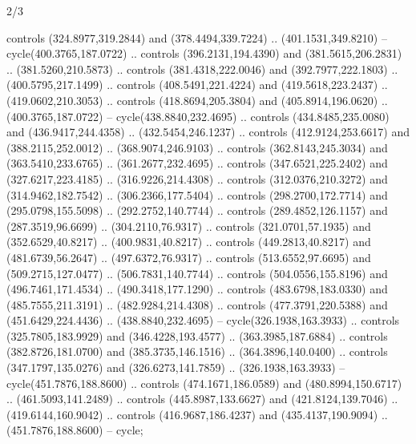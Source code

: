 \begin{flagdescription}{2/3}
\begin{scope}[xshift=0.5\flaglength,yshift=0.5\flagwidth,scale=\flagwidth/444.17]
\begin{scope}[y=-0.8pt, x=0.8pt,shift={(-400,-250)}]
  controls (324.8977,319.2844) and (378.4494,339.7224) .. (401.1531,349.8210) --
  cycle(400.3765,187.0722) .. controls (396.2131,194.4390) and
  (381.5615,206.2831) .. (381.5260,210.5873) .. controls (381.4318,222.0046) and
  (392.7977,222.1803) .. (400.5795,217.1499) .. controls (408.5491,221.4224) and
  (419.5618,223.2437) .. (419.0602,210.3053) .. controls (418.8694,205.3804) and
  (405.8914,196.0620) .. (400.3765,187.0722) -- cycle(438.8840,232.4695) ..
  controls (434.8485,235.0080) and (436.9417,244.4358) .. (432.5454,246.1237) ..
  controls (412.9124,253.6617) and (388.2115,252.0012) .. (368.9074,246.9103) ..
  controls (362.8143,245.3034) and (363.5410,233.6765) .. (361.2677,232.4695) ..
  controls (347.6521,225.2402) and (327.6217,223.4185) .. (316.9226,214.4308) ..
  controls (312.0376,210.3272) and (314.9462,182.7542) .. (306.2366,177.5404) ..
  controls (298.2700,172.7714) and (295.0798,155.5098) .. (292.2752,140.7744) ..
  controls (289.4852,126.1157) and (287.3519,96.6699) .. (304.2110,76.9317) ..
  controls (321.0701,57.1935) and (352.6529,40.8217) .. (400.9831,40.8217) ..
  controls (449.2813,40.8217) and (481.6739,56.2647) .. (497.6372,76.9317) ..
  controls (513.6552,97.6695) and (509.2715,127.0477) .. (506.7831,140.7744) ..
  controls (504.0556,155.8196) and (496.7461,171.4534) .. (490.3418,177.1290) ..
  controls (483.6798,183.0330) and (485.7555,211.3191) .. (482.9284,214.4308) ..
  controls (477.3791,220.5388) and (451.6429,224.4436) .. (438.8840,232.4695) --
  cycle(326.1938,163.3933) .. controls (325.7805,183.9929) and
  (346.4228,193.4577) .. (363.3985,187.6884) .. controls (382.8726,181.0700) and
  (385.3735,146.1516) .. (364.3896,140.0400) .. controls (347.1797,135.0276) and
  (326.6273,141.7859) .. (326.1938,163.3933) -- cycle(451.7876,188.8600) ..
  controls (474.1671,186.0589) and (480.8994,150.6717) .. (461.5093,141.2489) ..
  controls (445.8987,133.6627) and (421.8124,139.7046) .. (419.6144,160.9042) ..
  controls (416.9687,186.4237) and (435.4137,190.9094) .. (451.7876,188.8600) --
  cycle;
\end{scope}
\end{scope}
\framecode{}
\end{flagdescription}
